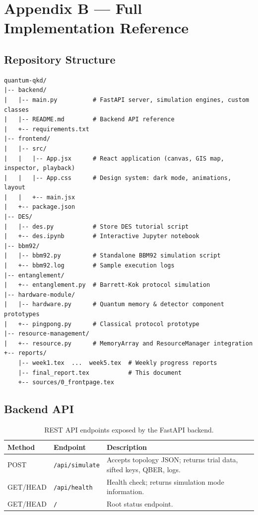 \documentclass[12pt,oneside,letterpaper,english]{article}
\begin{document}
\section{Appendix B --- Full Implementation Reference}
\label{app:impl}

\subsection{Repository Structure}

\begin{lstlisting}[language={}, basicstyle=\footnotesize\ttfamily, frame=none,
    numbers=none, backgroundcolor=\color{white}, breaklines=false]
quantum-qkd/
|-- backend/
|   |-- main.py          # FastAPI server, simulation engines, custom classes
|   |-- README.md        # Backend API reference
|   +-- requirements.txt
|-- frontend/
|   |-- src/
|   |   |-- App.jsx      # React application (canvas, GIS map, inspector, playback)
|   |   |-- App.css      # Design system: dark mode, animations, layout
|   |   +-- main.jsx
|   +-- package.json
|-- DES/
|   |-- des.py           # Store DES tutorial script
|   +-- des.ipynb        # Interactive Jupyter notebook
|-- bbm92/
|   |-- bbm92.py         # Standalone BBM92 simulation script
|   +-- bbm92.log        # Sample execution logs
|-- entanglement/
|   +-- entanglement.py  # Barrett-Kok protocol simulation
|-- hardware-module/
|   |-- hardware.py      # Quantum memory & detector component prototypes
|   +-- pingpong.py      # Classical protocol prototype
|-- resource-management/
|   +-- resource.py      # MemoryArray and ResourceManager integration
+-- reports/
    |-- week1.tex  ...  week5.tex  # Weekly progress reports
    |-- final_report.tex           # This document
    +-- sources/0_frontpage.tex
\end{lstlisting}

\subsection{Backend API}

\begin{table}[h!]
\centering
\caption{REST API endpoints exposed by the FastAPI backend.}
\label{tab:api}
\begin{tabular}{llp{8cm}}
\toprule
\textbf{Method} & \textbf{Endpoint} & \textbf{Description} \\
\midrule
POST & \texttt{/api/simulate} & Accepts topology JSON; returns trial data, sifted keys, QBER, logs. \\
GET/HEAD & \texttt{/api/health} & Health check; returns simulation mode information. \\
GET/HEAD & \texttt{/} & Root status endpoint. \\
\bottomrule
\end{tabular}
\end{table}
\end{document}
